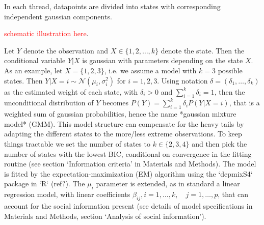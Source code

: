 \documentclass[9pt,twocolumn,twoside,lineno]{pnas-new}
\begin{document}
In each thread, datapoints are divided into states with corresponding independent gaussian components. 

\textcolor{red}{schematic illustration here}. 

Let $Y$ denote the observation and $X\in\{1,2,\dots,k\}$ denote the state. Then the conditional variable $Y|X$ is gaussian with parameters depending on the state $X$. As an example, let $X=\{1,2,3\}$, i.e. we assume a model with $k=3$ possible states. Then $Y|X=i \sim \mathcal{N}(\mu_i,\sigma_i^2)$ for $i=1,2,3$. Using notation $\delta = (\delta_1,\dots,\delta_k)$ as the estimated weight of each state, with $\delta_i >0$ and $\sum_{i=1}^k\delta_i = 1$, then the unconditional distribution of $Y$ becomes $P(Y) = \sum_{i=1}^k \delta_i P(Y|X=i)$, that is a weighted sum of gaussian probabilities, hence the name *gaussian mixture model* (GMM). This model structure can compensate for the heavy tails by adapting the different states to the more/less extreme observations.  To keep things tractable we set the number of states to $k\in\{2,3,4\}$ and then pick the number of states with the lowest BIC, conditional on convergence in the fitting routine (see section `Information criteria' in Materials and Methods). The model is fitted by the expectation-maximization (EM) algorithm using the `depmixS4` package in `R` (ref?). The $\mu_i$ parameter is extended, as in standard a linear regression model, with linear coefficients $\beta_{ij}, i=1,\dots,k, \quad j=1,\dots,p$, that can account for the social information present (see details of model specifications in Materials and Methods, section `Analysis of social information').

\end{document}
